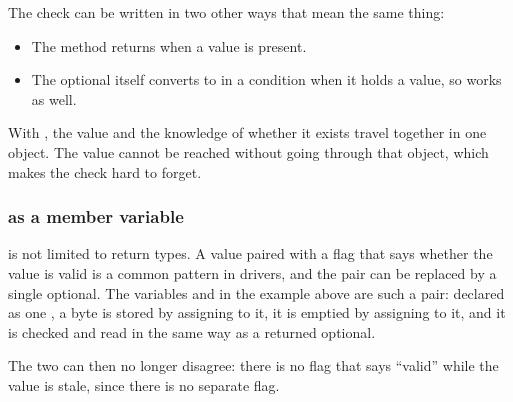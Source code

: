 \noindent The check can be written in two other ways that mean the same thing:
\begin{itemize}
  \item The method  returns  when a value is present.
  \item The optional itself converts to  in a condition when it holds a value, so
     works as well.
\end{itemize}
With , the value and the knowledge of whether it exists travel together in one
object. The value cannot be reached without going through that object, which makes the check hard
to forget.

\subsubsection{ as a member variable}
 is not limited to return types. A value paired with a flag that says whether
the value is valid is a common pattern in drivers, and the pair can be replaced by a single
optional. The variables  and  in the example above are such a pair:
declared as one , a byte is stored by assigning to it, it is
emptied by assigning  to it, and it is checked and read in the same way as a
returned optional.

The two can then no longer disagree: there is no flag that says ``valid'' while the value is
stale, since there is no separate flag.

